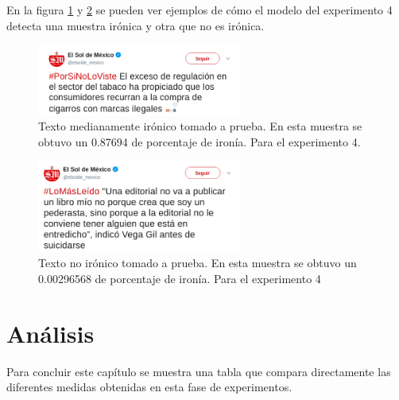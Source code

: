 \par En la figura \ref{fig:ironyTest3} y \ref{fig:ironyTest4} se pueden ver ejemplos de cómo el modelo del experimento 4 detecta una muestra irónica y otra que no es irónica.

\begin{figure}[h]
	\centering
	\includegraphics[width=0.6\textwidth]{imagenes/ironia3.png}
	\caption{Texto medianamente irónico tomado a prueba. En esta muestra se obtuvo un 0.87694 de porcentaje de ironía. Para el experimento 4.} %
	\label{fig:ironyTest3}
\end{figure}

\begin{figure}[h]
	\centering
	\includegraphics[width=0.6\textwidth]{imagenes/ironia4.png}
	\caption{Texto no irónico tomado a prueba. En esta muestra se obtuvo un 0.00296568 de porcentaje de ironía. Para el experimento 4} %
	\label{fig:ironyTest4}
\end{figure}







\section{Análisis}
\par Para concluir este capítulo se muestra una tabla que compara directamente las diferentes medidas obtenidas en esta fase de experimentos.

\begin{center}
	\begin{table}[H]
		\centering
		
		\label{tab:total}
	\end{table}
\end{center}

